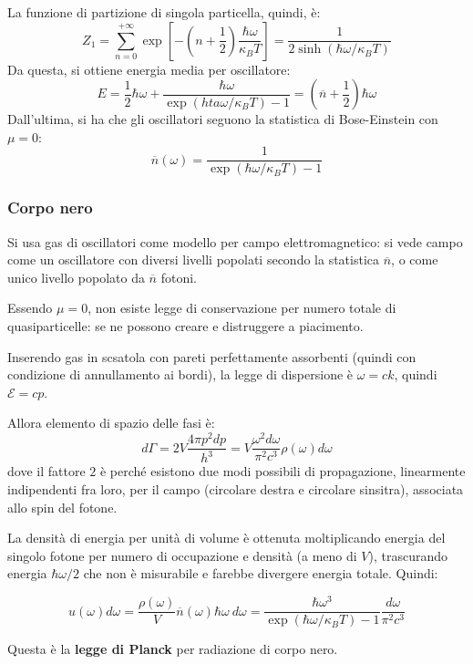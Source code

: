 \documentclass[10pt, a4paper]{scrartcl}
\numberwithin{equation}{subsection}
\theoremstyle{style1}
\newenvironment{boxenv}[1][]{
    \begin{eqbox}[#1]
    }{
   \end{eqbox}
}
\begin{document}
La funzione di partizione di singola particella, quindi, \`e:
\begin{equation}
	Z_1 = \sum_{n=0}^{+\infty} \exp \left[ - \left(n + \frac{1}{2}\right) \frac{\hbar \omega}{\kappa _B T} \right] = \frac{1}{2 \operatorname{sinh}(\hbar  \omega / \kappa _B T) }
\end{equation}
Da questa, si ottiene energia media per oscillatore:
\begin{equation}
	E = \frac{1}{2}\hbar  \omega + \frac{\hbar  \omega}{\exp(hta \omega / \kappa _B T) - 1} = \left(\overline{n} + \frac{1}{2}\right) \hbar \omega
\end{equation}
Dall'ultima, si ha che gli oscillatori seguono la statistica di Bose-Einstein con $\mu =0$:
\begin{equation}
	\overline{n}(\omega) = \frac{1}{\exp(\hbar \omega / \kappa _B T) - 1}
\end{equation}
\subsubsection{Corpo nero}
Si usa gas di oscillatori come modello per campo elettromagnetico: si vede campo come un oscillatore con diversi livelli popolati secondo la statistica $\overline{n}$, o come unico livello popolato da $\overline{n}$ fotoni.

Essendo $\mu  =0 $, non esiste legge di conservazione per numero totale di quasiparticelle: se ne possono creare e distruggere a piacimento.

Inserendo gas in scsatola con pareti perfettamente assorbenti (quindi con condizione di annullamento ai bordi), la legge di dispersione \`e $\omega = ck$, quindi $\mathscr{E} = cp$.

Allora elemento di spazio delle fasi \`e:
\begin{equation}
	d\Gamma = 2V \frac{4 \pi p^2 dp}{h^3} = V \frac{\omega^2 d\omega }{\pi^2 c^3} \rho (\omega) d\omega
\end{equation}
dove il fattore $2$ \`e perch\'e esistono due modi possibili di propagazione, linearmente indipendenti fra loro, per il campo (circolare destra e circolare sinsitra), associata allo spin del fotone.

La densit\`a di energia per unit\`a di volume \`e ottenuta moltiplicando energia del singolo fotone per numero di occupazione e densit\`a (a meno di $V$), trascurando energia $\hbar  \omega / 2$ che non \`e misurabile e farebbe divergere energia totale. 
Quindi:
\begin{boxenv}[]
\begin{equation}
	u(\omega ) d\omega = \frac{\rho (\omega)}{V} \overline{n}(\omega) \hbar \omega \ d\omega= \frac{\hbar  \omega^3}{\exp(\hbar \omega / \kappa _B T ) - 1} \frac{d\omega}{\pi^2 c^3}
\end{equation}
\end{boxenv}
\noindent Questa \`e la \textbf{legge di Planck} per radiazione di corpo nero. 
\end{document}
